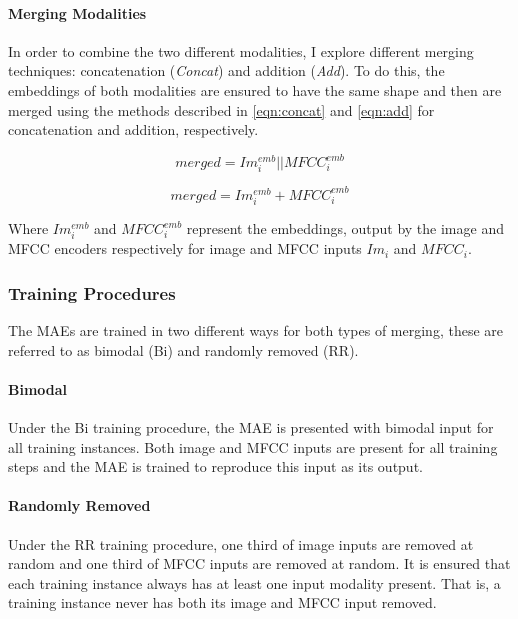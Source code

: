 \paragraph{Merging Modalities}
In order to combine the two different modalities, I explore different merging techniques: concatenation (\textit{Concat}) and addition (\textit{Add}). To do this, the embeddings of both modalities are ensured to have the same shape and then are merged using the methods described in \autoref{eqn:concat} and \autoref{eqn:add} for concatenation and addition, respectively. %

 \begin{equation}\label{eqn:concat}
 	merged = Im_i^{emb} || MFCC_i^{emb} 	
 \end{equation}

 \begin{equation}\label{eqn:add}  
 	merged = Im_i^{emb} + MFCC_i^{emb} 	
 \end{equation}
 

Where $Im_i^{emb}$ and $MFCC_i^{emb}$ represent the embeddings, output by the image and \ac{MFCC} encoders respectively for image and \ac{MFCC} inputs $Im_i$ and $MFCC_i$.

\subsubsection{Training Procedures}

The \acp{MAE} are trained in two different ways for both types of merging, these are referred to as bimodal (Bi) and randomly removed (RR).

\paragraph{Bimodal}
Under the Bi training procedure, the \ac{MAE} is presented with bimodal input for all training instances. Both image and \ac{MFCC} inputs are present for all training steps and the \ac{MAE} is trained to reproduce this input as its output.

\paragraph{Randomly Removed}
Under the RR training procedure, one third of image inputs are removed at random and one third of \ac{MFCC} inputs are removed at random. It is ensured that each training instance always has at least one input modality present. That is, a training instance never has both its image and \ac{MFCC} input removed. 

